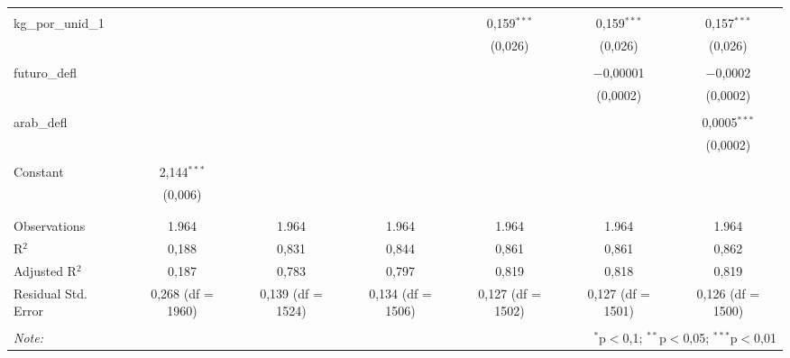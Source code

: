 \begin{table}[!htbp]
\begin{tabular}{@{\extracolsep{5pt}}lcccccc}
  & & & & & & \\ 
 kg\_por\_unid\_1 &  &  &  & 0,159$^{***}$ & 0,159$^{***}$ & 0,157$^{***}$ \\ 
  &  &  &  & (0,026) & (0,026) & (0,026) \\ 
  & & & & & & \\ 
 futuro\_defl &  &  &  &  & $-$0,00001 & $-$0,0002 \\ 
  &  &  &  &  & (0,0002) & (0,0002) \\ 
  & & & & & & \\ 
 arab\_defl &  &  &  &  &  & 0,0005$^{***}$ \\ 
  &  &  &  &  &  & (0,0002) \\ 
  & & & & & & \\ 
 Constant & 2,144$^{***}$ &  &  &  &  &  \\ 
  & (0,006) &  &  &  &  &  \\ 
  & & & & & & \\ 
\hline \\[-1.8ex] 
Observations & 1.964 & 1.964 & 1.964 & 1.964 & 1.964 & 1.964 \\ 
R$^{2}$ & 0,188 & 0,831 & 0,844 & 0,861 & 0,861 & 0,862 \\ 
Adjusted R$^{2}$ & 0,187 & 0,783 & 0,797 & 0,819 & 0,818 & 0,819 \\ 
Residual Std. Error & 0,268 (df = 1960) & 0,139 (df = 1524) & 0,134 (df = 1506) & 0,127 (df = 1502) & 0,127 (df = 1501) & 0,126 (df = 1500) \\ 
\hline 
\hline \\[-1.8ex] 
\textit{Note:}  & \multicolumn{6}{r}{$^{*}$p$<$0,1; $^{**}$p$<$0,05; $^{***}$p$<$0,01} \\ 
\end{tabular} 
\end{table} 
